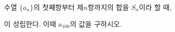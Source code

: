 \hspace*{2mm}\begin{minipage}[t]{\dimexpr\linewidth-2mm\relax}\vspace{0pt}
수열 $\{a_n\}$의 첫째항부터 제$n$항까지의 합을 $S_n$이라 할 때, \par\smallskip{}\par\smallskip\noindent 이 성립한다. 이때 $a_{100}$의 값을 구하시오.\end{minipage}

